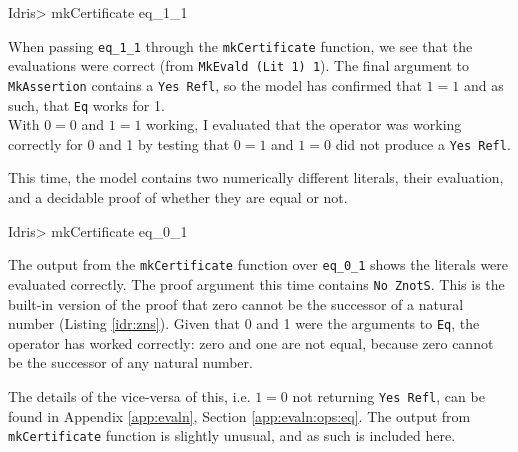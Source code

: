         \begin{code}
Idris> mkCertificate eq_1_1
        \end{code}
        
        When passing \texttt{eq\_1\_1} through the \texttt{mkCertificate} function, we see that the evaluations were correct (from \texttt{MkEvald (Lit 1) 1}). The final argument to \texttt{MkAssertion} contains a \texttt{Yes Refl}, so the model has confirmed that $1 = 1$ and as such, that \texttt{Eq} works for 1.
        \\
        
        
        
        
        With $0 = 0$ and $1 = 1$ working, I evaluated that the operator was working correctly for 0 and 1 by testing that $0 = 1$ and $1 = 0$ did not produce a \texttt{Yes Refl}.
        
        \newpage
        
        
        This time, the \Idris model contains two numerically different literals, their evaluation, and a decidable proof of whether they are equal or not.
        
        \begin{code}
Idris> mkCertificate eq_0_1
        \end{code}
        
        The output from the \texttt{mkCertificate} function over \texttt{eq\_0\_1} shows the literals were evaluated correctly. The proof argument this time contains \texttt{No ZnotS}. This is the built-in version of the proof that zero cannot be the successor of a natural number (Listing \ref{idr:zns}). Given that 0 and 1 were the arguments to \texttt{Eq}, the operator has worked correctly: zero and one are not equal, because zero cannot be the successor of any natural number.
        
        The details of the vice-versa of this, i.e. $1 = 0$ not returning \texttt{Yes Refl}, can be found in Appendix \ref{app:evaln}, Section \ref{app:evaln:ops:eq}. The output from \texttt{mkCertificate} function is slightly unusual, and as such is included here.
        
        \newpage
        
